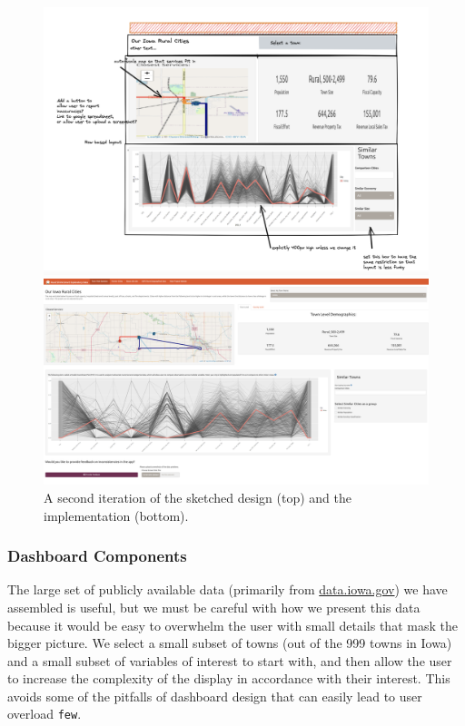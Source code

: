 \documentclass[letterpaper,inpress]{jdsart}
\begin{document}
\begin{figure}
\includegraphics[width=.8\textwidth]{Version3}

\includegraphics[width=\textwidth]{Version4}
\caption{A second iteration of the sketched design (top) and the implementation (bottom).}\label{fig:v2}
\end{figure}

\subsubsection{Dashboard Components}

The large set of publicly available data (primarily from \url{data.iowa.gov}) we have assembled is useful, but we must be careful with how we present this data because it would be easy to overwhelm the user with small details that mask the bigger picture. We select a small subset of towns (out of the 999 towns in Iowa) and a small subset of variables of interest to start with, and then allow the user to increase the complexity of the display in accordance with their interest. This avoids some of the pitfalls of dashboard design that can easily lead to user overload \texttt{few}.
\end{document}
